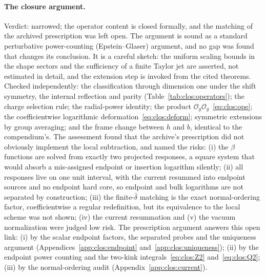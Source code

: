 \documentclass[11pt,a4paper]{article}
\numberwithin{equation}{section}
\newcommand{\db}{\bar\delta}
\newcommand{\Og}{\mathcal O_g}
\begin{document}
\paragraph{The closure argument.} Verdict: narrowed; the operator content is closed formally, and the matching of the
archived prescription was left open. The argument is sound as a standard
perturbative power-counting (Epstein--Glaser) argument, and no gap was found that changes its conclusion. It is a
careful sketch: the uniform scaling bounds in the shape sectors and the sufficiency of a finite Taylor jet are
asserted, not estimated in detail, and the extension step is invoked from the cited theorems. Checked independently:
the classification through dimension one under the shift symmetry, the internal reflection and parity
(Table~\ref{tab:clos:operators}); the charge selection rule; the radial-power identity; the product
$\Og\Og$~\eqref{eq:clos:ope}; the coefficientwise logarithmic deformation~\eqref{eq:clos:deform}; symmetric extensions by
group averaging; and the frame change between $h$ and $b$, identical to the compendium's. The assessment found that
the archive's prescription did not obviously implement the local subtraction, and named the risks: (i) the $\beta$
functions are solved from exactly two projected responses, a square system that would absorb a mis-assigned endpoint
or insertion logarithm silently; (ii) all responses live on one unit interval, with the current resummed into endpoint
sources and no endpoint hard core, so endpoint and bulk logarithms are not separated by construction; (iii) the
finite-$\db$ matching is the exact normal-ordering factor, coefficientwise a regular redefinition, but its equivalence
to the local scheme was not shown; (iv) the current resummation and (v) the vacuum normalization were judged low risk.
The prescription argument answers this open link: (i) by the scalar endpoint factors, the separated probes and the
uniqueness argument (Appendices~\ref{app:clos:endpoint} and~\ref{app:clos:uniqueness}); (ii) by the endpoint power
counting and the two-kink integrals~\eqref{eq:clos:Z2} and~\eqref{eq:clos:Q2}; (iii) by the normal-ordering audit
(Appendix~\ref{app:clos:current}).
\end{document}
